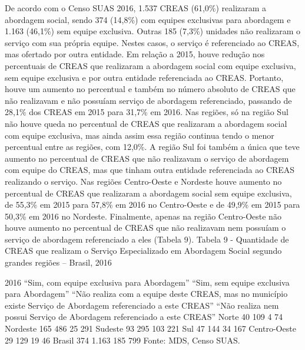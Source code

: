 \documentclass[
  brazilian]{report}
\begin{document}
De acordo com o Censo SUAS 2016, 1.537 CREAS (61,0\%) realizaram a
abordagem social, sendo 374 (14,8\%) com equipes exclusivas para
abordagem e 1.163 (46,1\%) sem equipe exclusiva. Outras 185 (7,3\%)
unidades não realizaram o serviço com sua própria equipe. Nestes casos,
o serviço é referenciado ao CREAS, mas ofertado por outra entidade. Em
relação a 2015, houve redução nos percentuais de CREAS que realizaram a
abordagem social com equipe exclusiva, sem equipe exclusiva e por outra
entidade referenciada ao CREAS. Portanto, houve um aumento no percentual
e também no número absoluto de CREAS que não realizavam e não possuíam
serviço de abordagem referenciado, passando de 28,1\% dos CREAS em 2015
para 31,7\% em 2016. Nas regiões, só na região Sul não houve queda no
percentual de CREAS que realizaram a abordagem social com equipe
exclusiva, mas ainda assim essa região continua tendo o menor percentual
entre as regiões, com 12,0\%. A região Sul foi também a única que teve
aumento no percentual de CREAS que não realizavam o serviço de abordagem
com equipe do CREAS, mas que tinham outra entidade referenciada ao CREAS
realizando o serviço. Nas regiões Centro-Oeste e Nordeste houve aumento
no percentual de CREAS que realizaram a abordagem social sem equipe
exclusiva, de 55,3\% em 2015 para 57,8\% em 2016 no Centro-Oeste e de
49,9\% em 2015 para 50,3\% em 2016 no Nordeste. Finalmente, apenas na
região Centro-Oeste não houve aumento no percentual de CREAS que não
realizavam nem possuíam o serviço de abordagem referenciado a eles
(Tabela 9). Tabela 9 - Quantidade de CREAS que realizam o Serviço
Especializado em Abordagem Social segundo grandes regiões -- Brasil,
2016

2016 ``Sim, com equipe exclusiva para Abordagem'' ``Sim, sem equipe
exclusiva para Abordagem'' ``Não realiza com a equipe deste CREAS, mas
no município existe Serviço de Abordagem referenciado a este CREAS''
``Não realiza nem possui Serviço de Abordagem referenciado a este
CREAS'' Norte 40 109 4 74 Nordeste 165 486 25 291 Sudeste 93 295 103 221
Sul 47 144 34 167 Centro-Oeste 29 129 19 46 Brasil 374 1.163 185 799
Fonte: MDS, Censo SUAS.
\end{document}
